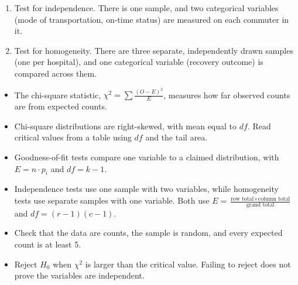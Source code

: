 \begin{Answer}[ref={ex:chisq-indep-vs-homog}]
\begin{enumerate}
    \item Test for independence. There is one sample, and two categorical variables (mode of transportation, on-time status) are measured on each commuter in it.
    \item Test for homogeneity. There are three separate, independently drawn samples (one per hospital), and one categorical variable (recovery outcome) is compared across them.
\end{enumerate}
\end{Answer}

\begin{mdframed}[style=important, frametitle={Key Ideas}]
\begin{itemize}
\item The chi-square statistic, $\chi^2 = \sum \frac{(O - E)^2}{E}$, measures how far observed counts are from expected counts.
\item Chi-square distributions are right-skewed, with mean equal to $df$. Read critical values from a table using $df$ and the tail area.
\item Goodness-of-fit tests compare one variable to a claimed distribution, with $E = n \cdot p_i$ and $df = k - 1$.
\item Independence tests use one sample with two variables, while homogeneity tests use separate samples with one variable. Both use $E = \frac{\text{row total} \times \text{column total}}{\text{grand total}}$ and $df = (r - 1)(c - 1)$.
\item Check that the data are counts, the sample is random, and every expected count is at least 5.
\item Reject $H_0$ when $\chi^2$ is larger than the critical value. Failing to reject does not prove the variables are independent.
\end{itemize}
\end{mdframed}
